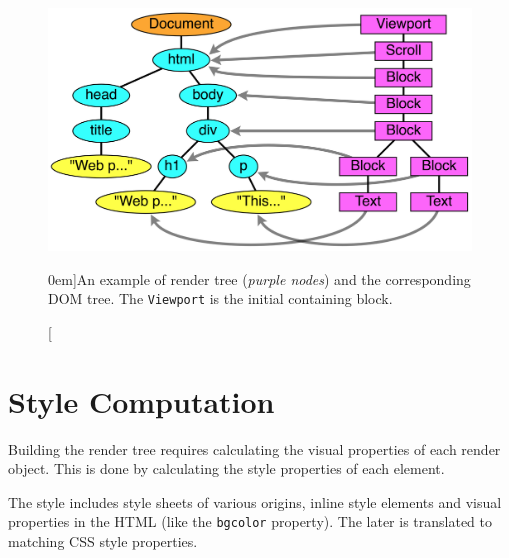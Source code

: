 \documentclass[a4paper, justified, notoc]{tufte-handout} %
\begin{document}
\begin{figure}%
	\centering
  \includegraphics[width=1.0\textwidth]{./figures/render_tree_example.png}
  \caption[][0em]{An example of render tree (\emph{purple nodes}) and the corresponding DOM tree. The \texttt{Viewport} is the initial containing block.}
  \label{fig:render_tree_example}
\end{figure}


\section{Style Computation} %
\label{sec:style_computation}
Building the render tree requires calculating the visual properties of each render object. This is done by calculating the style properties of each element.

The style includes style sheets of various origins, inline style elements and visual properties in the HTML (like the \texttt{bgcolor} property). The later is translated to matching CSS style properties.
\end{document}
